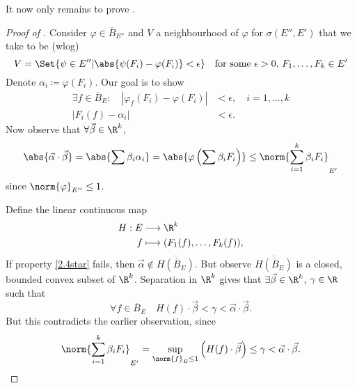 \documentclass[twoside]{article}
\begin{document}
It now only remains to prove .
\begin{proof}[Proof of ]
    Consider $\varphi \in \overline{B}_{E''}$ and $V$ a neighbourhood of $\varphi$ for $\sigma(E'', E')$ that we take to be (wlog)
    \begin{equation*}
        V = \Set{\psi \in E'' | \abs{\psi(F_i) - \varphi(F_i)} < \epsilon} \quad \text{for some $\epsilon > 0$, $F_1, \dotsc, F_k \in E'$}
    \end{equation*}
    Denote $\alpha_i \coloneqq \varphi(F_i)$. Our goal is to show
    \begin{align*}
        \exists f \in \overline{B}_E: \quad |\varphi_f(F_i) - \varphi(F_i)| &< \epsilon, \quad i = 1, \dotsc, k \tag{$*$}\label{2.4star}\\
        |F_i(f) - \alpha_i| &< \epsilon.
    \end{align*}
    Now observe that $\forall \vec{\beta} \in \R^k$,
    \begin{equation*}
        \abs{\vec{\alpha} \cdot \vec{\beta}} = \abs{\sum \beta_i \alpha_i} = \abs{\varphi\left(\sum \beta_i F_i\right)} \leq \norm{\sum_{i=1}^k \beta_i F_i}_{E'}
    \end{equation*}
    since $\norm{\varphi}_{E''} \leq 1$.

    Define the linear continuous map
    \begin{align*}
        H : E &\longrightarrow \R^k \\
        f &\longmapsto (F_1(f), \dotsc, F_k(f)),
    \end{align*}
    If property \eqref{2.4star} fails, then $\vec{\alpha} \notin \overline{H(\overline{B}_E)}$.
    But observe $\overline{H(\overline{B}_E)}$ is a closed, bounded convex subset of $\R^k$.
    Separation in $\R^k$ gives that $\exists \vec{\beta} \in \R^k$, $\gamma \in \R$ such that
    \begin{equation*}
        \forall f \in \overline{B}_E \quad H(f) \cdot \vec{\beta} < \gamma < \vec{\alpha} \cdot \vec{\beta}.
    \end{equation*}
    But this contradicts the earlier observation, since
    \begin{equation*}
        \norm{\sum_{i=1}^k \beta_i F_i}_{E'} = \sup_{\norm{f}_E \leq 1} \left(H(f) \cdot \vec{\beta}\right) \leq \gamma < \vec{\alpha} \cdot \vec{\beta}. \qedhere
    \end{equation*}
\end{proof}
\end{document}
